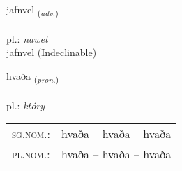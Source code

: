 \documentclass[frontgrid, backgrid]{flacards}\usepackage[]{graphicx}\usepackage[]{xcolor}
\begin{document}
\renewcommand{\flhead}{\vskip5pt \fboxsep=0pt {\small\bfseries\footnotesize Atviksorð | przysłówek}}
\renewcommand{\fcfoot}{\vskip5pt \fboxsep=0pt \hspace{2pt}{\small\bfseries\footnotesize 1K}}

\renewcommand{\blhead}{\vskip5pt {\small\bfseries\footnotesize Atviksorð | przysłówek }}
\renewcommand{\bcfoot}{\vskip5pt \hspace{2pt}{\small\bfseries\footnotesize 1K}}


{jafnvel \small{\textsubscript{(\textit{adv.})}} \\[1ex]
\textphonetic{[japvɛl]} \\
pl.: \emph{nawet} \\  [2ex]
jafnvel (Indeclinable)}

\renewcommand{\flhead}{\vskip5pt \fboxsep=0pt {\small\bfseries\footnotesize Fornafn | zaimek}}
\renewcommand{\fcfoot}{\vskip5pt \fboxsep=0pt \hspace{2pt}{\small\bfseries\footnotesize 1K}}

\renewcommand{\blhead}{\vskip5pt {\small\bfseries\footnotesize Fornafn | zaimek }}
\renewcommand{\bcfoot}{\vskip5pt \hspace{2pt}{\small\bfseries\footnotesize 1K}}


{hvaða \small{\textsubscript{(\textit{pron.})}} \\[1ex] %
\textphonetic{[kʰvaːða]} \\
pl.: \emph{który} \\  [2ex]
\renewcommand*{\arraystretch}{0.8}
\begin{tabular}{ll}
\textsc{sg.nom.}: & hvaða  --  hvaða -- hvaða \\ 
\textsc{pl.nom.}: & hvaða -- hvaða -- hvaða
\end{tabular}
}

\renewcommand{\flhead}{\vskip5pt \fboxsep=0pt {\small\bfseries\footnotesize Sagnorð | czasownik}}
\renewcommand{\fcfoot}{\vskip5pt \fboxsep=0pt \hspace{2pt}{\small\bfseries\footnotesize 1K}}
\end{document}
